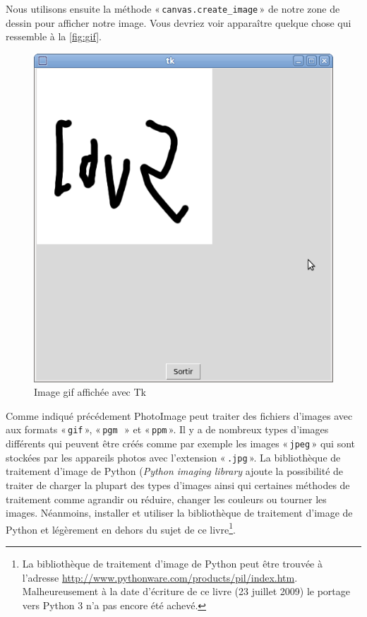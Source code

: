 Nous utilisons ensuite la méthode « \texttt{canvas.create\_image} » de notre zone de dessin pour afficher notre image. Vous devriez voir apparaître quelque chose qui ressemble à la \autoref{fig:gif}. 
\begin{figure}[h!]
\centering
\includegraphics[scale=0.4]{images/gif}
\caption{Image gif affichée avec Tk}\label{fig:gif}
\end{figure}


Comme indiqué précédement PhotoImage peut traiter des fichiers d'images avec aux formats « \texttt{gif} », « \texttt{pgm } » et « \texttt{ppm} ».
Il y a de nombreux types d'images différents qui peuvent être créés comme par exemple les images « \texttt{jpeg} » qui sont stockées par les appareils photos avec l'extension « \texttt{.jpg} ». 
La bibliothèque de traitement d'image de Python (\emph{Python imaging library} ajoute la possibilité de traiter de charger la plupart des types d'images ainsi qui certaines méthodes de traitement comme agrandir ou réduire, changer les couleurs ou tourner les images.  Néanmoins, installer et utiliser la bibliothèque de traitement d'image de Python et légèrement en dehors du sujet de ce livre\footnote{La  bibliothèque de traitement d'image de Python peut être trouvée à l'adresse \url{http://www.pythonware.com/products/pil/index.htm}. Malheureusement à la date d'écriture de ce livre (23 juillet 2009) le portage vers Python 3 n'a pas encore été achevé.}. 

